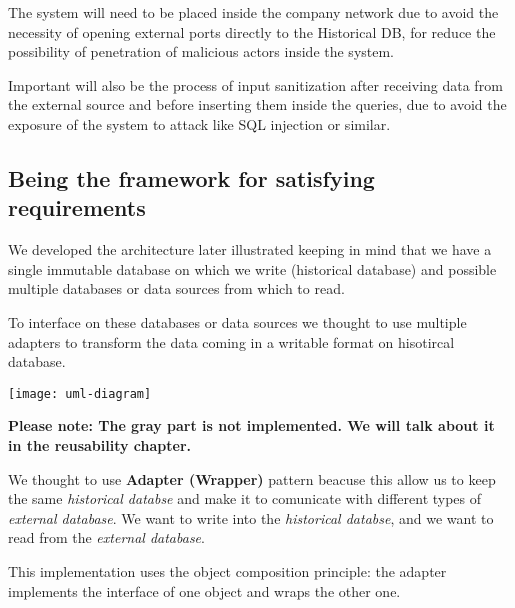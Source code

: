 The system will need to be placed inside the company network due to avoid the necessity of opening external ports directly to the Historical DB, for reduce the possibility of penetration of malicious actors inside the system.

Important will also be the process of input sanitization after receiving data from the external source and before inserting them inside the queries, due to avoid the exposure of the system to attack like SQL injection or similar.

\subsection{Being the framework for satisfying requirements}

We developed the architecture later illustrated keeping in mind that we have a single immutable database on which we write (historical database) and possible multiple databases or data sources from which to read.

To interface on these databases or data sources we thought to use multiple adapters to transform the data coming in a writable format on hisotircal database.

\begin{center}
\texttt{[image: uml-diagram]}
\end{center}

\textbf{Please note: The gray part is not implemented. We will talk about it in the reusability chapter.}

We thought to use \textbf{Adapter (Wrapper)} pattern beacuse this allow us to keep the same \textit{historical databse} and make it to comunicate with different types of \textit{external database}. We want to write into the \textit{historical databse}, and we want to read from the \textit{external database}.

This implementation uses the object composition principle: the adapter implements the interface of one object and wraps the other one.

